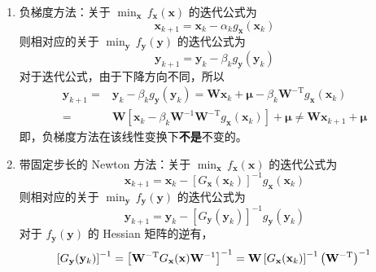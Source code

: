 \documentclass[cn,mtpro2,12pt]{elegantbook}
\begin{document}
\begin{solution}
    \begin{enumerate}
        \item 负梯度方法：关于 $\min_{\mathbf{x}}\,f_{\mathbf{x}}(\mathbf{x})$ 的迭代公式为
              \begin{equation}
                  \mathbf{x}_{k+1}=\mathbf{x}_{k}-\alpha_{k}g_{\mathbf{x}}(\mathbf{x}_{k})
              \end{equation}
              则相对应的关于 $\min_{\mathbf{y}}\,f_{\mathbf{y}}(\mathbf{y})$ 的迭代公式为
              \begin{equation}
                  \mathbf{y}_{k+1}=\mathbf{y}_{k}-\beta_{k}g_{\mathbf{y}}(\mathbf{y}_{k})
              \end{equation}
              对于迭代公式，由于下降方向不同，所以
              \begin{equation}
                  \begin{aligned}
                      \mathbf{y}_{k+1}= & \mathbf{y}_{k}-\beta_{k}g_{\mathbf{y}}(\mathbf{y}_{k})=\mathbf{W}\mathbf{x}_{k}+\boldsymbol{\mu}-\beta_{k}\mathbf{W}^{-\mathrm{T}}g_{\mathbf{x}}(\mathbf{x}_{k})                     \\
                      =                 & \mathbf{W}\left[\mathbf{x}_{k}-\beta_{k}\mathbf{W}^{-1}\mathbf{W}^{-\mathrm{T}}g_{\mathbf{x}}(\mathbf{x}_{k})\right]+\boldsymbol{\mu}\neq\mathbf{W}\mathbf{x}_{k+1}+\boldsymbol{\mu}
                  \end{aligned}
              \end{equation}
              即，负梯度方法在该线性变换下\textbf{不是}不变的。
        \item 带固定步长的 Newton 方法：关于 $\min_{\mathbf{x}}\,f_{\mathbf{x}}(\mathbf{x})$ 的迭代公式为
              \begin{equation}
                  \mathbf{x}_{k+1}=\mathbf{x}_{k}-\left[G_{\mathbf{x}}(\mathbf{x}_{k})\right]^{-1}g_{\mathbf{x}}(\mathbf{x}_{k})
              \end{equation}
              则相对应的关于 $\min_{\mathbf{y}}\,f_{\mathbf{y}}(\mathbf{y})$ 的迭代公式为
              \begin{equation}
                  \mathbf{y}_{k+1}=\mathbf{y}_{k}-\left[G_{\mathbf{y}}(\mathbf{y}_{k})\right]^{-1}g_{\mathbf{y}}(\mathbf{y}_{k})
              \end{equation}
              对于 $f_{\mathbf{y}}(\mathbf{y})$ 的 Hessian 矩阵的逆有，
              \begin{equation}
                  \left[G_{\mathbf{y}}(\mathbf{y}_{k})\right]^{-1}=\left[\mathbf{W}^{-\mathrm{T}}G_{\mathbf{x}}(\mathbf{x})\mathbf{W}^{-1}\right]^{-1}=\mathbf{W}\left[G_{\mathbf{x}}(\mathbf{x}_{k})\right]^{-1}\left(\mathbf{W}^{-\mathrm{T}}\right)^{-1} \\

\end{equation}
\end{enumerate}
\end{solution}
\end{document}
